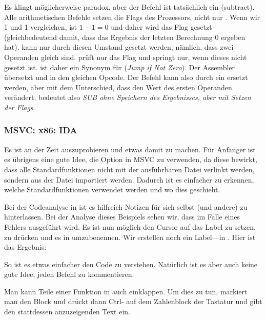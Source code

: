 \label{CMPandSUB}
Es klingt möglicherweise paradox, aber der \CMP Befehl ist tatsächlich ein \SUB (subtract).
Alle arithmetischen Befehle setzen die Flags des Prozessors, nicht nur \CMP.
Wenn wir 1 und 1 vergleichen, ist $1-1=0$ und daher wird das \ZF Flag gesetzt (gleichbedeutend damit, dass das Ergebnis
der letzten Berechnung 0 ergeben hat).
\ZF kann nur durch diesen Umstand gesetzt werden, nämlich, dass zwei Operanden gleich sind.
\JNE prüft nur das \ZF Flag und springt nur, wenn dieses nicht gesetzt ist. \JNE ist daher ein Synonym für \JNZ
(\emph{Jump if Not Zero}).
Der Assembler übersetzt \JNE und \JNZ in den gleichen Opcode.
Der \CMP Befehl kann also durch ein \SUB ersetzt werden, aber mit dem Unterschied, dass \SUB den Wert des ersten
Operanden verändert. \CMP bedeutet also \emph{SUB ohne Speichern des Ergebnisses, aber mit Setzen der Flags}.

\subsubsection{MSVC: x86: IDA}

Es ist an der Zeit \IDA auszuprobieren und etwas damit zu machen.
Für Anfänger ist es übrigens eine gute Idee, die  Option in MSVC zu verwenden, da diese bewirkt, dass alle
Standardfunktionen nicht mit der ausführbaren Datei verlinkt werden, sondern aus der Datei  importiert
werden. Dadurch ist es einfacher zu erkennen, welche Standardfunktionen verwendet werden und wo dies geschieht.

Bei der Codeanalyse in \IDA ist es hilfreich Notizen für sich selbst (und andere) zu hinterlassen.
Bei der Analyse dieses Beispiels sehen wir, dass  im Falle eines Fehlers ausgeführt wird.
Es ist nun möglich den Cursor auf das Label zu setzen,  zu drücken und es in  umzubenennen.
Wir erstellen noch ein Label---in .
Hier ist das Ergebnis:


So ist es etwas einfacher den Code zu verstehen. Natürlich ist es aber auch keine gute Idee, jeden Befehl zu
kommentieren.

Man kann Teile einer Funktion in \IDA auch einklappen. Um dies zu tun, markiert man den Block und drückt dann Ctrl-\q{--} auf
dem Zahlenblock der Tastatur und gibt den stattdessen anzuzeigenden Text ein.

